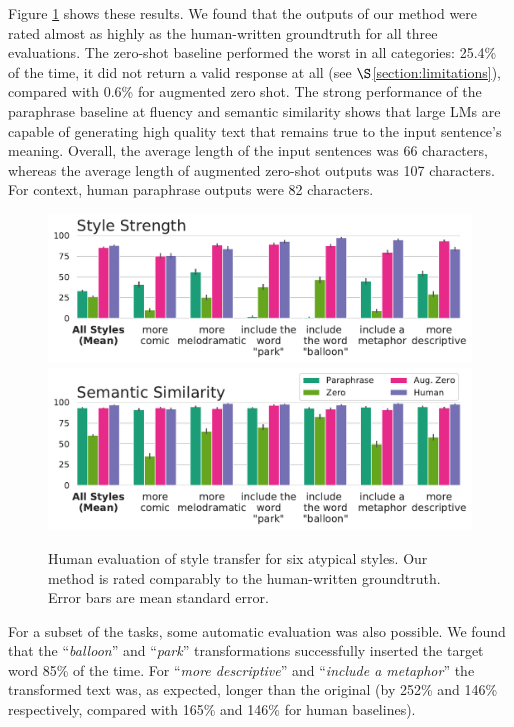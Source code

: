 Figure \ref{human_eval_other_styles} shows these results. %
We found that the outputs of our method were rated almost as highly as the human-written groundtruth for all three evaluations. The zero-shot baseline performed the worst in all categories: 25.4\% of the time, it did not return a valid response at all (see $\S$\ref{section:limitations}), compared with 0.6\% for augmented zero shot.
The strong performance of the paraphrase baseline at fluency and semantic similarity shows that large LMs are capable of generating high quality text that remains true to the input sentence's meaning.
Overall, the average length of the input sentences was 66 characters, whereas the average length of augmented zero-shot outputs was 107 characters. For context, human paraphrase outputs were 82 characters.
\begin{figure}[tbp]
    \includegraphics[width=0.5\linewidth]{figures/style_standard_False.pdf}
    \includegraphics[width=0.5\linewidth]{figures/meaning_standard_False.pdf}
  \caption{Human evaluation of style transfer for six atypical styles. Our method is rated comparably to the human-written groundtruth. Error bars are mean standard error.}
  \label{human_eval_other_styles}
\end{figure}

For a subset of the tasks, some automatic evaluation was also possible.
We found that the ``\textit{balloon}'' and ``\textit{park}'' transformations successfully inserted the target word 85\% of the time.
For ``\textit{more descriptive}'' and ``\textit{include a metaphor}'' the transformed text was, as expected, longer than the original (by 252\% and 146\% respectively, compared with 165\% and 146\% for human baselines).


